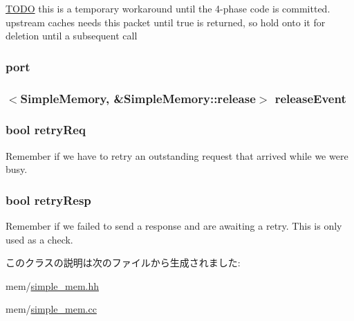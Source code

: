 \label{classSimpleMemory_a21da4bea3554874b557428e4cce5d4a4}
\begin{Desc}
\item[\hyperlink{todo__todo000087}{TODO}]this is a temporary workaround until the 4-\/phase code is committed. upstream caches needs this packet until true is returned, so hold onto it for deletion until a subsequent call \end{Desc}
\hypertarget{classSimpleMemory_a55c076720c982014096b57cadebf9a14}{
\subsubsection[{port}]{ {\bf port}}}
\label{classSimpleMemory_a55c076720c982014096b57cadebf9a14}
\hypertarget{classSimpleMemory_a152504c9de53c1ab4c16f4dceaa6bbfa}{
\subsubsection[{releaseEvent}]{$<${\bf SimpleMemory}, \&SimpleMemory::release$>$ {\bf releaseEvent}}}
\label{classSimpleMemory_a152504c9de53c1ab4c16f4dceaa6bbfa}
\hypertarget{classSimpleMemory_aab3b947b2633a30b5973a39b7e9b018a}{
\subsubsection[{retryReq}]{\setlength{\rightskip}{0pt plus 5cm}bool {\bf retryReq}}}
\label{classSimpleMemory_aab3b947b2633a30b5973a39b7e9b018a}
Remember if we have to retry an outstanding request that arrived while we were busy. \hypertarget{classSimpleMemory_a6ddfdd4eb676d50001bda88567e6da14}{
\subsubsection[{retryResp}]{\setlength{\rightskip}{0pt plus 5cm}bool {\bf retryResp}}}
\label{classSimpleMemory_a6ddfdd4eb676d50001bda88567e6da14}
Remember if we failed to send a response and are awaiting a retry. This is only used as a check. 

このクラスの説明は次のファイルから生成されました:\begin{DoxyCompactItemize}
\item 
mem/\hyperlink{simple__mem_8hh}{simple\_\-mem.hh}\item 
mem/\hyperlink{simple__mem_8cc}{simple\_\-mem.cc}\end{DoxyCompactItemize}
